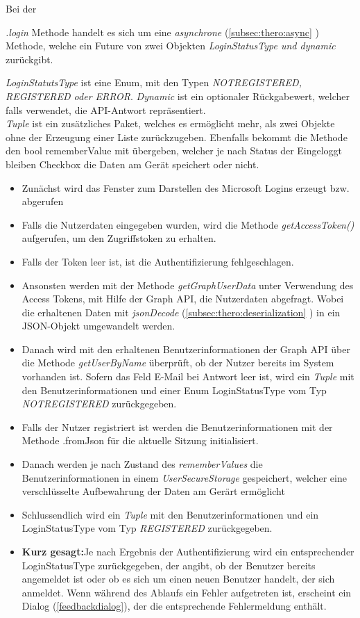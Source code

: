 Bei der {\textit{.login} Methode handelt es sich um eine {\textit{asynchrone}} (\ref{subsec:thero:async} ) Methode, welche ein Future von zwei Objekten {\textit{LoginStatusType und dynamic}} zurückgibt. 

\vspace{0.3cm}
{\textit{LoginStatutsType} ist eine Enum, mit den Typen {{\textit{NOTREGISTERED, REGISTERED oder ERROR}}}. {\textit{Dynamic}} ist ein optionaler Rückgabewert, welcher falls verwendet, die API-Antwort repräsentiert.\\ 

{\textit{Tuple}} ist ein zusätzliches Paket, welches es ermöglicht mehr, als zwei Objekte ohne der Erzeugung einer Liste zurückzugeben. Ebenfalls bekommt die Methode den bool {rememberValue} mit übergeben, welcher je nach Status der {Eingeloggt bleiben} Checkbox die Daten am Gerät speichert oder nicht.
\begin{itemize}
    \item Zunächst wird das Fenster zum Darstellen des Microsoft Logins erzeugt bzw. abgerufen
    \item Falls die Nutzerdaten eingegeben wurden, wird die Methode {\textit{getAccessToken()}} aufgerufen, um den Zugriffstoken zu erhalten.
    \item Falls der Token leer ist, ist die Authentifizierung fehlgeschlagen.
    \item Ansonsten werden mit der Methode {\textit{getGraphUserData}} unter Verwendung des Access Tokens, mit Hilfe der Graph API, die Nutzerdaten abgefragt. Wobei die erhaltenen Daten mit {\textit{jsonDecode}} (\ref{subsec:thero:deserialization} ) in ein JSON-Objekt umgewandelt werden.
    \item Danach wird mit den erhaltenen Benutzerinformationen der Graph API über die Methode {\textit{getUserByName} }überprüft, ob der Nutzer bereits im System vorhanden ist. Sofern das Feld E-Mail bei Antwort leer ist, wird ein {\textit{Tuple}} mit den Benutzerinformationen und einer Enum LoginStatusType vom Typ {\textit{NOTREGISTERED}} zurückgegeben.
    \item Falls der Nutzer registriert ist werden die Benutzerinformationen mit der Methode {\textit{}{.fromJson}} für die aktuelle Sitzung initialisiert.
    \item Danach werden je nach Zustand des {\textit{rememberValues}} die Benutzerinformationen in einem {\textit{UserSecureStorage}} gespeichert, welcher eine verschl\"usselte Aufbewahrung der Daten am Ger\"art erm\"oglicht
    \item Schlussendlich wird ein {\textit{Tuple}} mit den Benutzerinformationen und ein LoginStatusType vom Typ {\textit{REGISTERED}} zurückgegeben.
    \item {\textbf{Kurz gesagt:}}Je nach Ergebnis der Authentifizierung wird ein entsprechender LoginStatusType zurückgegeben, der angibt, ob der Benutzer bereits angemeldet ist oder ob es sich um einen neuen Benutzer handelt, der sich anmeldet. Wenn während des Ablaufs ein Fehler aufgetreten ist, erscheint ein Dialog (\ref{feedbackdialog}), der die entsprechende Fehlermeldung enthält.
\end{itemize}
}}
